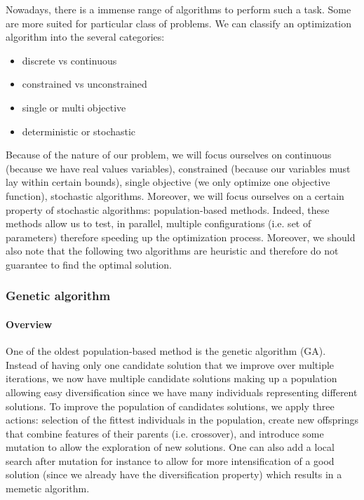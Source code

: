     Nowadays, there is a immense range of algorithms to perform such a task. Some are more suited for particular class of problems. We can classify an optimization algorithm into the several categories:

    \begin{itemize}
        \item discrete vs continuous
        \item constrained vs unconstrained
        \item single or multi objective
        \item deterministic or stochastic
    \end{itemize}
    
    Because of the nature of our problem, we will focus ourselves on continuous (because we have real values variables), constrained (because our variables must lay within certain bounds), single objective (we only optimize one objective function), stochastic algorithms. Moreover, we will focus ourselves on a certain property of stochastic algorithms: population-based methods. Indeed, these methods allow us to test, in parallel, multiple configurations (i.e. set of parameters) therefore speeding up the optimization process. Moreover, we should also note that the following two algorithms are heuristic and therefore do not guarantee to find the optimal solution. 

    \subsubsection{Genetic algorithm}

    \paragraph{Overview}
        One of the oldest population-based method is the genetic algorithm (GA). Instead of having only one candidate solution that we improve over multiple iterations, we now have multiple candidate solutions making up a population allowing easy diversification since we have many individuals representing different solutions. To improve the population of candidates solutions, we apply three actions: selection of the fittest individuals in the population, create new offsprings that combine features of their parents (i.e. crossover), and introduce some mutation to allow the exploration of new solutions. One can also add a local search after mutation for instance to allow for more intensification of a good solution (since we already have the diversification property) which results in a memetic algorithm. \cite{contiGA} \cite{holland1992genetic}


